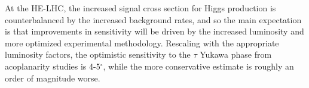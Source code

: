 \documentclass[../report.tex]{subfiles}
\begin{document}
At the HE-LHC, the increased signal cross section for Higgs production
is counterbalanced by the increased background rates, and so the main
expectation is that improvements in sensitivity will be driven by the
increased luminosity and more optimized experimental methodology.
Rescaling with the appropriate luminosity factors, the optimistic
sensitivity to the $\tau$ Yukawa phase from acoplanarity studies is
4-5$^\circ$, while the more conservative estimate is roughly an order
of magnitude worse.
\end{document}
